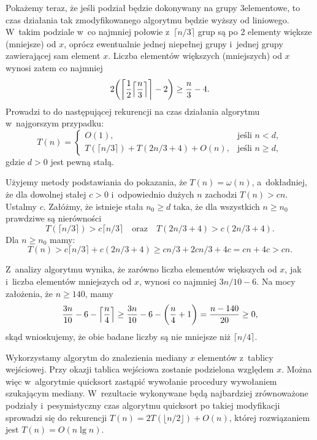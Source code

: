 Pokażemy teraz, że jeśli podział będzie dokonywany na grupy 3\nbhyphen elementowe, to czas działania tak zmodyfikowanego algorytmu  będzie wyższy od liniowego.
W~takim podziale w~co najmniej połowie z~$\lceil n/3\rceil$ grup są po 2 elementy większe (mniejsze) od $x$, oprócz ewentualnie jednej niepełnej grupy i~jednej grupy zawierającej sam element $x$.
Liczba elementów większych (mniejszych) od $x$ wynosi zatem co najmniej
\[
	2\biggl(\biggl\lceil\frac{1}{2}\Bigl\lceil\frac{n}{3}\Bigr\rceil\biggr\rceil-2\biggr) \ge \frac{n}{3}-4.
\]
Prowadzi to do następującej rekurencji na czas działania algorytmu w~najgorszym przypadku:
\[
	T(n) = \begin{cases}
		O(1), & \text{jeśli $n<d$}, \\
		T(\lceil n/3\rceil)+T(2n/3+4)+O(n), & \text{jeśli $n\ge d$},
	\end{cases}
\]
gdzie $d>0$ jest pewną stałą.

Użyjemy metody podstawiania do pokazania, że $T(n)=\omega(n)$, a~dokładniej, że dla dowolnej stałej $c>0$ i~odpowiednio dużych $n$ zachodzi $T(n)>cn$.
Ustalmy $c$.
Załóżmy, że istnieje stała $n_0\ge d$ taka, że dla wszystkich $n\ge n_0$ prawdziwe są nierówności
\[
	T(\lceil n/3\rceil) > c\lceil n/3\rceil \quad\text{oraz}\quad T(2n/3+4) > c(2n/3+4).
\]
Dla $n\ge n_0$ mamy:
\[
	T(n) > c\lceil n/3\rceil+c(2n/3+4) \ge cn/3+2cn/3+4c = cn+4c > cn.
\]

\exercise %
Z~analizy algorytmu  wynika, że zarówno liczba elementów większych od $x$, jak i~liczba elementów mniejszych od $x$, wynosi co najmniej $3n/10-6$.
Na mocy założenia, że $n\ge140$, mamy
\[
	\frac{3n}{10}-6-\Bigl\lceil\frac{n}{4}\Bigr\rceil \ge \frac{3n}{10}-6-\biggl(\frac{n}{4}+1\biggr) = \frac{n-140}{20} \ge 0,
\]
skąd wnioskujemy, że obie badane liczby są nie mniejsze niż $\lceil n/4\rceil$.

\exercise %

\noindent Wykorzystamy algorytm  do znalezienia mediany $x$ elementów z~tablicy wejściowej.
Przy okazji tablica wejściowa zostanie podzielona względem $x$.
Można więc w~algorytmie quicksort zastąpić wywołanie procedury  wywołaniem  szukającym mediany.
W~rezultacie wykonywane będą najbardziej zrównoważone podziały i~pesymistyczny czas algorytmu quicksort po takiej modyfikacji sprowadzi się do rekurencji $T(n)=2T(\lfloor n/2\rfloor)+O(n)$, której rozwiązaniem jest $T(n)=O(n\lg n)$.

